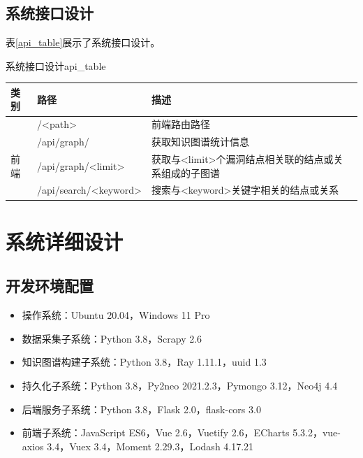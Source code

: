 \documentclass[a4paper,AutoFakeBold,oneside,12pt]{book}
\begin{document}
\subsection{系统接口设计}

表\ref{api_table}展示了系统接口设计。
\begin{bupttable}{系统接口设计}{api_table}
	\begin{tabularx}{\textwidth}{llX}
		\toprule
		\textbf{类别} & \textbf{路径}         & \textbf{描述}                                         \\ \midrule
		              & /<path>               & 前端路由路径                                          \\ \cmidrule(l){2-3}
		              & /api/graph/           & 获取知识图谱统计信息                                  \\ \cmidrule(l){2-3}
		前端          & /api/graph/<limit>    & 获取与<limit>个漏洞结点相关联的结点或关系组成的子图谱 \\ \cmidrule(l){2-3}
		              & /api/search/<keyword> & 搜索与<keyword>关键字相关的结点或关系                 \\ \bottomrule %
	\end{tabularx}
\end{bupttable}

\section{系统详细设计}

\subsection{开发环境配置}

\begin{itemize}
	\item 操作系统：Ubuntu 20.04，Windows 11 Pro
	\item 数据采集子系统：Python 3.8，Scrapy 2.6
	\item 知识图谱构建子系统：Python 3.8，Ray 1.11.1，uuid 1.3
	\item 持久化子系统：Python 3.8，Py2neo 2021.2.3，Pymongo 3.12，Neo4j 4.4
	\item 后端服务子系统：Python 3.8，Flask 2.0，flask-cors 3.0
	\item 前端子系统：JavaScript ES6，Vue 2.6，Vuetify 2.6，ECharts 5.3.2，vue-axios 3.4，Vuex 3.4，Moment 2.29.3，Lodash 4.17.21
\end{itemize}
\end{document}
